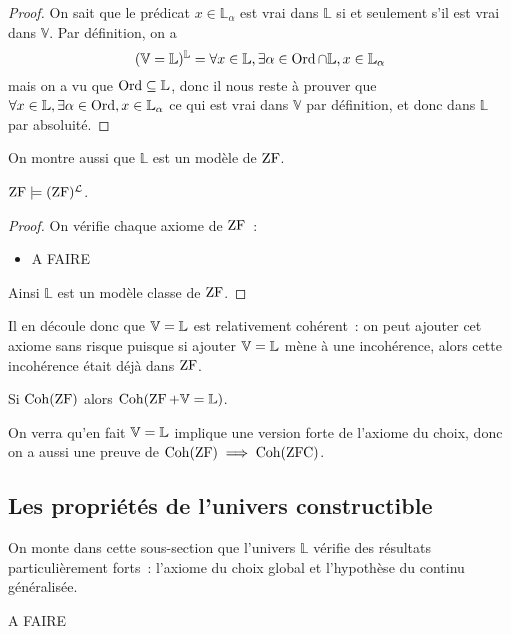 \begin{proof}
  On sait que le prédicat $x\in \mathbb L_{\alpha}$ est vrai dans
  $\mathbb L$ si et seulement s'il est vrai dans $\mathbb V$. Par définition,
  on a
  \[(\mathbb V = \mathbb L)^{\mathbb L} =
  \forall x \in \mathbb L,\exists \alpha \in \operatorname{Ord}\cap \mathbb L,
  x\in \mathbb L_\alpha\]
  mais on a vu que $\operatorname{Ord}\subseteq \mathbb L$, donc il nous reste à prouver que
  $\forall x \in \mathbb L, \exists \alpha \in \operatorname{Ord}, x \in \mathbb L_\alpha$
  ce qui est vrai dans $\mathbb V$ par définition, et donc dans
  $\mathbb L$ par absoluité.
\end{proof}

On montre aussi que $\mathbb L$ est un modèle de $\operatorname{ZF}$.

\begin{theorem}
  $\operatorname{ZF}\models (\operatorname{ZF})^{\mathcal L}$.
\end{theorem}

\begin{proof}
  On vérifie chaque axiome de $\operatorname{ZF}$~:
  \begin{itemize}
  \item A FAIRE
  \end{itemize}
  Ainsi $\mathbb L$ est un modèle classe de $\operatorname{ZF}$.
\end{proof}

Il en découle donc que $\mathbb V = \mathbb L$ est relativement cohérent~: on peut ajouter cet
axiome sans risque puisque si ajouter $\mathbb V = \mathbb L$ mène à une incohérence, alors
cette incohérence était déjà dans $\operatorname{ZF}$.

\begin{corollary}
  Si $\operatorname{Coh}(\operatorname{ZF})$ alors $\operatorname{Coh}(\operatorname{ZF} + \mathbb V = \mathbb L)$.
\end{corollary}

\begin{remark}
  On verra qu'en fait $\mathbb V = \mathbb L$ implique une version forte de l'axiome du choix,
  donc on a aussi une preuve de $\operatorname{Coh}(\operatorname{ZF})\implies \operatorname{Coh}(\operatorname{ZFC})$.
\end{remark}

\subsection{Les propriétés de l'univers constructible}

On monte dans cette sous-section que l'univers $\mathbb L$ vérifie des résultats
particulièrement forts~: l'axiome du choix global et l'hypothèse du continu
généralisée.

A FAIRE
